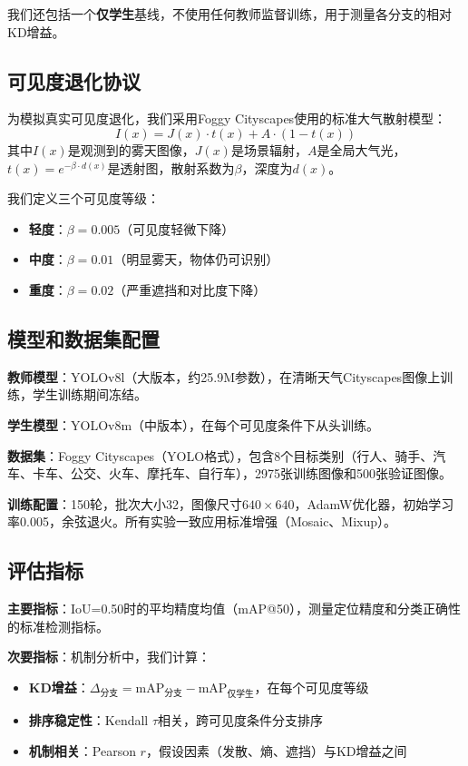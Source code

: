 我们还包括一个\textbf{仅学生}基线，不使用任何教师监督训练，用于测量各分支的相对KD增益。

\subsection{可见度退化协议}

为模拟真实可见度退化，我们采用Foggy Cityscapes\cite{sakaridis2018semantic}使用的标准大气散射模型：
\begin{equation}
I(x) = J(x) \cdot t(x) + A \cdot (1 - t(x))
\end{equation}
其中$I(x)$是观测到的雾天图像，$J(x)$是场景辐射，$A$是全局大气光，$t(x) = e^{-\beta \cdot d(x)}$是透射图，散射系数为$\beta$，深度为$d(x)$。

我们定义三个可见度等级：
\begin{itemize}
    \item \textbf{轻度}：$\beta = 0.005$（可见度轻微下降）
    \item \textbf{中度}：$\beta = 0.01$（明显雾天，物体仍可识别）
    \item \textbf{重度}：$\beta = 0.02$（严重遮挡和对比度下降）
\end{itemize}

\subsection{模型和数据集配置}

\textbf{教师模型}：YOLOv8l（大版本，约25.9M参数），在清晰天气Cityscapes图像上训练，学生训练期间冻结。

\textbf{学生模型}：YOLOv8m（中版本），在每个可见度条件下从头训练。

\textbf{数据集}：Foggy Cityscapes（YOLO格式），包含8个目标类别（行人、骑手、汽车、卡车、公交、火车、摩托车、自行车），2975张训练图像和500张验证图像。

\textbf{训练配置}：150轮，批次大小32，图像尺寸$640 \times 640$，AdamW优化器，初始学习率0.005，余弦退火。所有实验一致应用标准增强（Mosaic、Mixup）。

\subsection{评估指标}

\textbf{主要指标}：IoU=0.50时的平均精度均值（mAP@50），测量定位精度和分类正确性的标准检测指标。

\textbf{次要指标}：机制分析中，我们计算：
\begin{itemize}
    \item \textbf{KD增益}：$\Delta_{\text{分支}} = \text{mAP}_{\text{分支}} - \text{mAP}_{\text{仅学生}}$，在每个可见度等级
    \item \textbf{排序稳定性}：Kendall $\tau$相关，跨可见度条件分支排序
    \item \textbf{机制相关}：Pearson $r$，假设因素（发散、熵、遮挡）与KD增益之间
\end{itemize}

